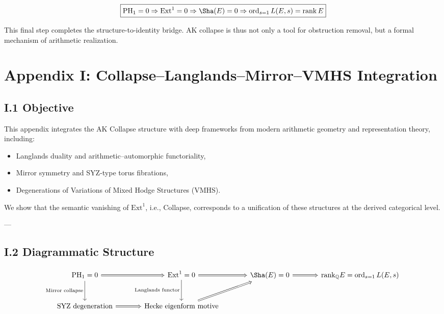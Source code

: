 \[
\boxed{
\mathrm{PH}_1 = 0 \Rightarrow \mathrm{Ext}^1 = 0 \Rightarrow \Sha(E) = 0 \Rightarrow \operatorname{ord}_{s=1} L(E,s) = \operatorname{rank} E
}
\]

This final step completes the structure-to-identity bridge.  
AK collapse is thus not only a tool for obstruction removal,  
but a formal mechanism of arithmetic realization.



\section*{Appendix I: Collapse–Langlands–Mirror–VMHS Integration}

\subsection*{I.1 Objective}

This appendix integrates the AK Collapse structure  
with deep frameworks from modern arithmetic geometry and representation theory, including:

\begin{itemize}
  \item Langlands duality and arithmetic–automorphic functoriality,
  \item Mirror symmetry and SYZ-type torus fibrations,
  \item Degenerations of Variations of Mixed Hodge Structures (VMHS).
\end{itemize}

We show that the semantic vanishing of \( \mathrm{Ext}^1 \), i.e., Collapse,  
corresponds to a unification of these structures at the derived categorical level.

---

\subsection*{I.2 Diagrammatic Structure}

\[
\begin{tikzcd}[row sep=large, column sep=large]
\mathrm{PH}_1 = 0 \arrow[r, Rightarrow] \arrow[d, "\text{Mirror collapse}"'] &
\mathrm{Ext}^1 = 0 \arrow[r, Rightarrow] \arrow[d, "\text{Langlands functor}"'] &
\Sha(E) = 0 \arrow[r, Rightarrow] &
\mathrm{rank}_{\mathbb{Q}} E = \operatorname{ord}_{s=1} L(E,s) \\
\text{SYZ degeneration} \arrow[r, Rightarrow] &
\text{Hecke eigenform motive} \arrow[ur, Rightarrow] &
\end{tikzcd}
\]

